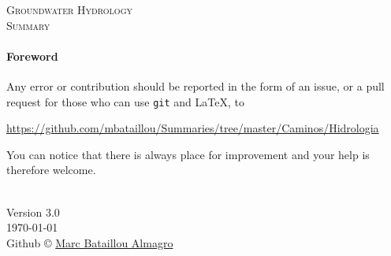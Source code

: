 \documentclass[landscape]{article}
\newcommand{\version}{3.0}
\begin{document}
\setlength{\abovedisplayskip}{1pt}
\setlength{\belowdisplayskip}{1pt}

\thispagestyle{empty}
\begin{center}
  \vspace*{\fill}
  \textsc{\Huge Groundwater Hydrology\\[2ex] \huge Summary}
  \vfill
  \footnotesize{\paragraph{Foreword}
        Any error or contribution should be reported
        in the form of an issue, or a pull request for those
        who can use \texttt{git} and \LaTeX, to
        \begin{center}
          \url{https://github.com/mbataillou/Summaries/tree/master/Caminos/Hidrologia}
        \end{center}
        You can notice that there is always place for improvement
        and your help is therefore welcome.
        \vspace{\baselineskip}}\\
  \footnotesize{
    Version \version\\[1ex]
    \today\\[1ex]
    Github \copyright{}
    \href{https://github.com/mbataillou?tab=repositories}{Marc Bataillou Almagro}\\
  }
\end{center}
\newpage

\thispagestyle{empty}
\begin{multicols*}{3}
  \tableofcontents
\end{multicols*}
\newpage
\end{document}
